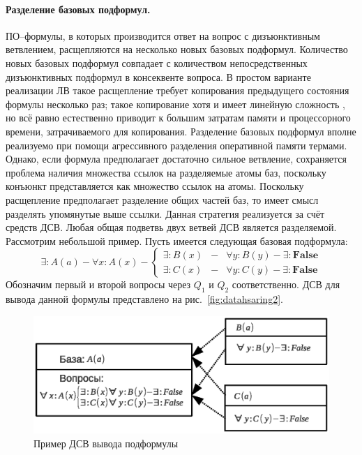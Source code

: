 \paragraph{Разделение базовых подформул.} ПО--формулы, в которых производится ответ на вопрос с дизъюнктивным ветвлением, расщепляются на несколько новых базовых подформул. Количество новых базовых подформул совпадает с количеством непосредственных дизъюнктивных подформул в консеквенте вопроса. В простом варианте реализации ЛВ \cite{dissChe} такое расщепление требует копирования предыдущего состояния формулы несколько раз; такое копирование хотя и имеет линейную сложность \cite{Che2}, но всё равно естественно приводит к большим затратам памяти и процессорного времени, затрачиваемого для копирования. Разделение базовых подформул вполне реализуемо при помощи агрессивного разделения оперативной памяти термами. Однако, если формула предполагает достаточно сильное ветвление, сохраняется проблема наличия множества ссылок на разделяемые атомы баз, поскольку конъюнкт представляется как множество ссылок на атомы. Поскольку расщепление предполагает разделение общих частей баз, то имеет смысл разделять упомянутые выше ссылки. Данная стратегия реализуется за счёт средств ДСВ. Любая общая подветвь двух ветвей ДСВ является разделяемой. Рассмотрим небольшой пример. Пусть имеется следующая базовая подформула:
$$\exists: A(a) - \forall x: A(x) - \left\{
\begin{array}{lcl}
 \exists \colon B(x) & - & \forall y: B(y) - \exists\colon\boldsymbol{False}\\
 \exists \colon C(x) & - & \forall y: C(y) - \exists\colon\boldsymbol{False}
\end{array}
\right. $$
Обозначим первый и второй вопросы через $Q_1$ и $Q_2$ соответственно. ДСВ для вывода данной формулы представлено на рис.~\ref{fig:datahsaring2}.
\begin{figure}[h]
	\centering
	\includegraphics[width=0.7\linewidth]{pics/DataSharing2.eps}
	\caption{Пример ДСВ вывода подформулы}
	\label{fig:datasharing2}
\end{figure}

